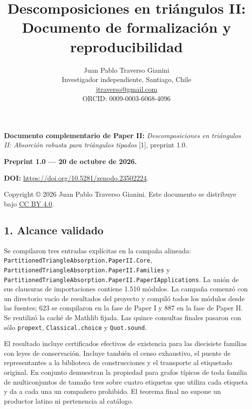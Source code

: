 \documentclass[spanish,11pt,a4paper]{article}
\title{Descomposiciones en triángulos II: Documento de formalización y reproducibilidad}
\author{Juan Pablo Traverso Gianini\\
\small Investigador independiente, Santiago, Chile\\
\small \href{mailto:jtraverso@gmail.com}{jtraverso@gmail.com}\\
\small ORCID: 0009-0003-6068-4096}
\date{}
\begin{document}
\raggedbottom
\maketitle
\textbf{Documento complementario de Paper II:} \emph{Descomposiciones en triángulos II: Absorción robusta para triángulos tipados} {[}1{]}, preprint 1.0.

\textbf{Preprint 1.0 --- 20 de octubre de 2026.}

\textbf{DOI:} \url{https://doi.org/10.5281/zenodo.23502224}.

Copyright © 2026 Juan Pablo Traverso Gianini. Este documento se distribuye bajo \href{https://creativecommons.org/licenses/by/4.0/}{CC BY 4.0}.

\subsection{1. Alcance validado}\label{alcance-validado}

Se compilaron tres entradas explícitas en la campaña alineada: \texttt{Partitioned\allowbreak{}T\allowbreak{}riangle\allowbreak{}Absor\allowbreak{}ption.\allowbreak{}Paper\allowbreak{}I\allowbreak{}I.\allowbreak{}Core}, \texttt{Partitioned\allowbreak{}T\allowbreak{}riangle\allowbreak{}Absor\allowbreak{}ption.\allowbreak{}Paper\allowbreak{}I\allowbreak{}I.\allowbreak{}Families} y \texttt{Partitioned\allowbreak{}T\allowbreak{}riangle\allowbreak{}Absor\allowbreak{}ption.\allowbreak{}Paper\allowbreak{}I\allowbreak{}I.\allowbreak{}Paper\allowbreak{}IAppl\allowbreak{}ications}. La unión de sus clausuras de importaciones contiene 1.510 módulos. La campaña comenzó con un directorio vacío de resultados del proyecto y compiló todos los módulos desde las fuentes; 623 se compilaron en la fase de Paper I y 887 en la fase de Paper II. Se reutilizó la caché de Mathlib fijada. Las quince consultas finales pasaron con sólo \texttt{propext}, \texttt{Classical.\allowbreak{}ch\allowbreak{}oice} y \texttt{Quot.\allowbreak{}sound}.

El resultado incluye certificados efectivos de existencia para las diecisiete familias con leyes de conservación. Incluye también el censo exhaustivo, el puente de representantes a la biblioteca de construcciones y el transporte al etiquetado original. En conjunto demuestran la propiedad para grafos típicos de toda familia de multiconjuntos de tamaño tres sobre cuatro etiquetas que utiliza cada etiqueta y da a cada una un compañero prohibido. El teorema final no supone un productor latino ni pertenencia al catálogo.
\end{document}
